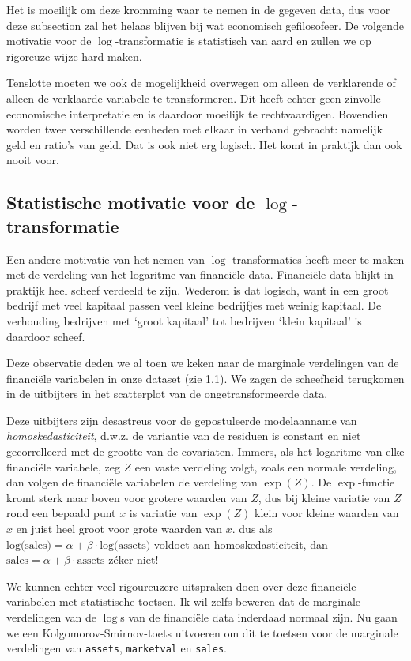 \documentclass[a4paper, notitlepage]{report}
\begin{document}
  
  Het is moeilijk om deze kromming waar te nemen in de gegeven data, dus voor deze subsection zal het helaas blijven bij wat economisch gefilosofeer. De volgende motivatie voor de $\log$-transformatie is statistisch van aard en zullen we op rigoreuze wijze hard maken.
  
  Tenslotte moeten we ook de mogelijkheid overwegen om alleen de verklarende of alleen de verklaarde variabele te transformeren. Dit heeft echter geen zinvolle economische interpretatie en is daardoor moeilijk te rechtvaardigen. Bovendien worden twee verschillende eenheden met elkaar in verband gebracht: namelijk geld en ratio's van geld. Dat is ook niet erg logisch. Het komt in praktijk dan ook nooit voor.
 
\subsection{Statistische motivatie voor de $\log$-transformatie} 
  Een andere motivatie van het nemen van $\log$-transformaties heeft meer te maken met de verdeling van het logaritme van financi\"ele data. Financi\"ele data blijkt in praktijk heel scheef verdeeld te zijn. Wederom is dat logisch, want in een groot bedrijf met veel kapitaal passen veel kleine bedrijfjes met weinig kapitaal. De verhouding bedrijven met `groot kapitaal' tot bedrijven `klein kapitaal' is daardoor scheef. 
  
  Deze observatie deden we al toen we keken naar de marginale verdelingen van de financi\"ele variabelen in onze dataset (zie 1.1). We zagen de scheefheid terugkomen in de uitbijters in het scatterplot van de ongetransformeerde data.
  
  Deze uitbijters zijn desastreus voor de gepostuleerde modelaanname van \emph{homoskedasticiteit}, d.w.z. de variantie van de residuen is constant en niet gecorrelleerd met de grootte van de covariaten. Immers, als het logaritme van elke financi\"ele variabele, zeg $Z$ een vaste verdeling volgt, zoals een normale verdeling, dan volgen de financi\"ele variabelen de verdeling van $\exp(Z)$. De $\exp$-functie kromt sterk naar boven voor grotere waarden van $Z$, dus bij kleine variatie van $Z$ rond een bepaald punt $x$ is variatie van $\exp(Z)$ klein voor kleine waarden van $x$ en juist heel groot voor grote waarden van $x$. dus als $\text{log(sales)} = \alpha + \beta \cdot \text{log(assets)}$ voldoet aan homoskedasticiteit, dan $\text{sales} = \alpha + \beta \cdot \text{assets}$ z\' eker niet!
  
  We kunnen echter veel rigoureuzere uitspraken doen over deze financi\"ele variabelen met statistische toetsen. Ik wil zelfs beweren dat de marginale verdelingen van de $\log$s van de financi\"ele data inderdaad normaal zijn. Nu gaan we een Kolgomorov-Smirnov-toets uitvoeren om dit te toetsen voor de marginale verdelingen van \verb!assets!, \verb!marketval! en \verb!sales!.
  
\end{document}
